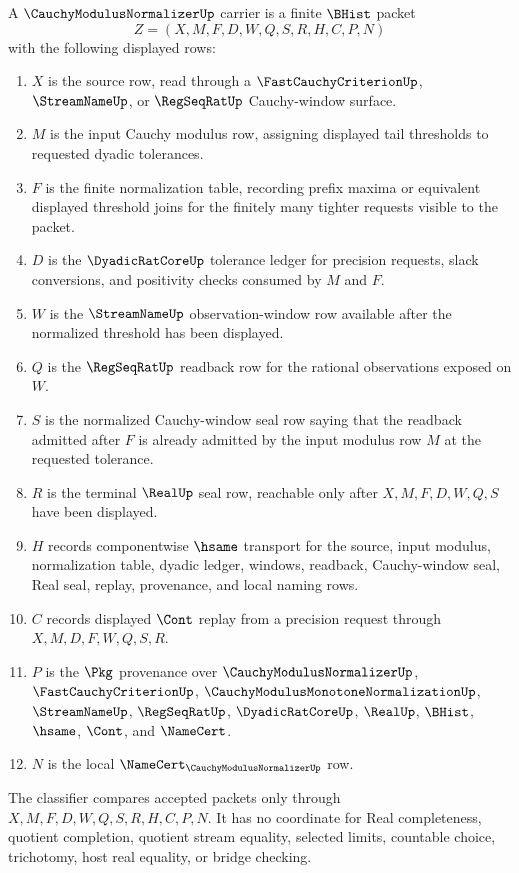 \begin{definition}
\label{def:cauchy-modulus-normalizer-carrier}
A $\CauchyModulusNormalizerUp$ carrier is a finite $\BHist$ packet
$$
Z=(X,M,F,D,W,Q,S,R,H,C,P,N)
$$
with the following displayed rows:
\begin{enumerate}
\item $X$ is the source row, read through a $\FastCauchyCriterionUp$, $\StreamNameUp$, or $\RegSeqRatUp$ Cauchy-window surface.
\item $M$ is the input Cauchy modulus row, assigning displayed tail thresholds to requested dyadic tolerances.
\item $F$ is the finite normalization table, recording prefix maxima or equivalent displayed threshold joins for the finitely many tighter requests visible to the packet.
\item $D$ is the $\DyadicRatCoreUp$ tolerance ledger for precision requests, slack conversions, and positivity checks consumed by $M$ and $F$.
\item $W$ is the $\StreamNameUp$ observation-window row available after the normalized threshold has been displayed.
\item $Q$ is the $\RegSeqRatUp$ readback row for the rational observations exposed on $W$.
\item $S$ is the normalized Cauchy-window seal row saying that the readback admitted after $F$ is already admitted by the input modulus row $M$ at the requested tolerance.
\item $R$ is the terminal $\RealUp$ seal row, reachable only after $X,M,F,D,W,Q,S$ have been displayed.
\item $H$ records componentwise $\hsame$ transport for the source, input modulus, normalization table, dyadic ledger, windows, readback, Cauchy-window seal, Real seal, replay, provenance, and local naming rows.
\item $C$ records displayed $\Cont$ replay from a precision request through $X,M,D,F,W,Q,S,R$.
\item $P$ is the $\Pkg$ provenance over $\CauchyModulusNormalizerUp$, $\FastCauchyCriterionUp$, $\CauchyModulusMonotoneNormalizationUp$, $\StreamNameUp$, $\RegSeqRatUp$, $\DyadicRatCoreUp$, $\RealUp$, $\BHist$, $\hsame$, $\Cont$, and $\NameCert$.
\item $N$ is the local $\NameCert_{\CauchyModulusNormalizerUp}$ row.
\end{enumerate}
The classifier compares accepted packets only through $X,M,F,D,W,Q,S,R,H,C,P,N$. It has no coordinate for Real completeness, quotient completion, quotient stream equality, selected limits, countable choice, trichotomy, host real equality, or bridge checking.
\end{definition}

